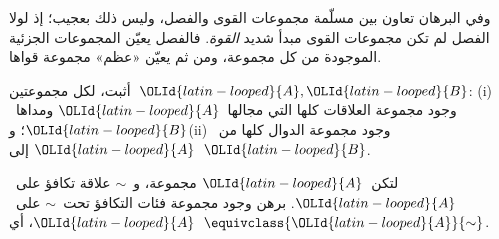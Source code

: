 \documentclass[../../../include/open-logic-section]{subfiles}
\begin{document}
وفي البرهان تعاون بين مسلّمة مجموعات القوى والفصل، وليس ذلك بعجيب؛ إذ
لولا الفصل لم تكن مجموعات القوى مبدأ شديد \emph{القوة}. فالفصل يعيّن
المجموعات الجزئية الموجودة من كل مجموعة، ومن ثم يعيّن «عظم» مجموعة
قواها.

\begin{prob}
أثبت، لكل مجموعتين~${\OLId{latin-looped}{A}},{\OLId{latin-looped}{B}}$: (i) وجود مجموعة العلاقات كلها التي مجالها~${\OLId{latin-looped}{A}}$
ومداها~${\OLId{latin-looped}{B}}$؛ و(ii) وجود مجموعة الدوال كلها من~${\OLId{latin-looped}{A}}$ إلى~${\OLId{latin-looped}{B}}$.
\end{prob}

\begin{prob}
لتكن~${\OLId{latin-looped}{A}}$ مجموعة، و~$\sim$ علاقة تكافؤ على~${\OLId{latin-looped}{A}}$. برهن وجود مجموعة فئات
التكافؤ تحت~$\sim$ على~${\OLId{latin-looped}{A}}$، أي~$\equivclass{{\OLId{latin-looped}{A}}}{\sim}$.
\end{prob}
\end{document}
